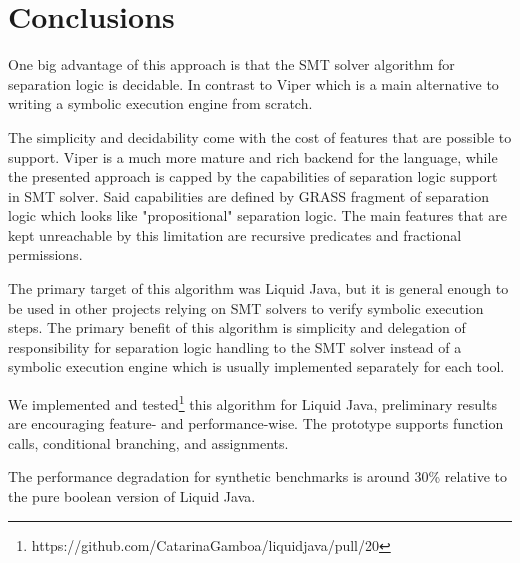 \documentclass[sigplan,screen,review]{acmart}
\begin{document}
\section{Conclusions}

One big advantage of this approach is that the SMT solver algorithm for separation logic is decidable. In contrast to Viper\cite{muller2016viper} which is a main alternative to writing a symbolic execution engine from scratch. 

The simplicity and decidability come with the cost of features that are possible to support. Viper is a much more mature and rich backend for the language, while the presented approach is capped by the capabilities of separation logic support in SMT solver. Said capabilities are defined by GRASS fragment of separation logic which looks like "propositional" separation logic. The main features that are kept unreachable by this limitation are recursive predicates and fractional permissions\cite{boyland2003checking}. 

The primary target of this algorithm was Liquid Java\cite{gamboa2021user}, but it is general enough to be used in other projects relying on SMT solvers to verify symbolic execution steps. The primary benefit of this algorithm is simplicity and delegation of responsibility for separation logic handling to the SMT solver instead of a symbolic execution engine which is usually implemented separately for each tool. 

We implemented and tested\footnote{https://github.com/CatarinaGamboa/liquidjava/pull/20} this algorithm for Liquid Java, preliminary results are encouraging feature- and performance-wise. The prototype supports function calls, conditional branching, and assignments.

The performance degradation for synthetic benchmarks is around 30\% relative to the pure boolean version of Liquid Java.



\end{document}
